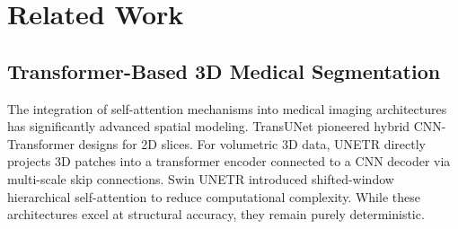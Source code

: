 \documentclass[10pt,journal,compsoc]{IEEEtran}
\begin{document}
\section{Related Work}
\subsection{Transformer-Based 3D Medical Segmentation}
The integration of self-attention mechanisms into medical imaging architectures has significantly advanced spatial modeling. TransUNet \cite{7} pioneered hybrid CNN-Transformer designs for 2D slices. For volumetric 3D data, UNETR \cite{Hatamizadeh2021UNETR} directly projects 3D patches into a transformer encoder connected to a CNN decoder via multi-scale skip connections. Swin UNETR \cite{Hatamizadeh2022SwinUNETR} introduced shifted-window hierarchical self-attention to reduce computational complexity. While these architectures excel at structural accuracy, they remain purely deterministic.
\end{document}
